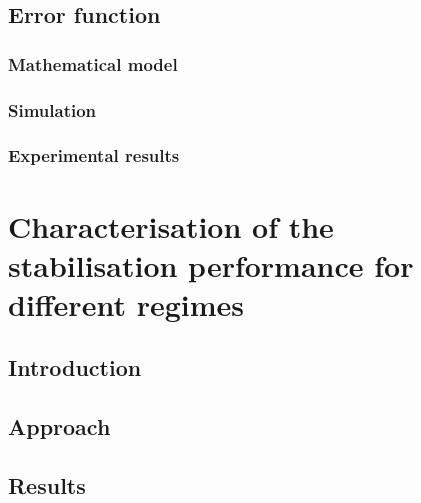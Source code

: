 
\subsection{Error function}


\subsubsection{Mathematical model}


\subsubsection{Simulation}


\subsubsection{Experimental results}


\section{Characterisation of the stabilisation performance for different regimes}


\subsection{Introduction}


\subsection{Approach}


\subsection{Results}